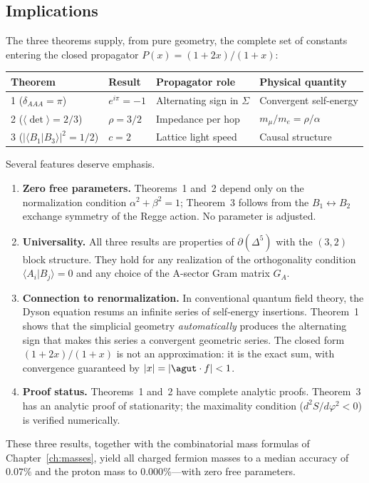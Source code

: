 \subsection{Implications}
\label{sec:variational_implications}

The three theorems supply, from pure geometry, the complete set of
constants entering the closed propagator $P(x) = (1+2x)/(1+x)$:

\begin{center}
\renewcommand{\arraystretch}{1.3}
\begin{tabular}{llll}
\toprule
Theorem & Result & Propagator role & Physical quantity \\
\midrule
1 ($\delta_{AAA} = \pi$) & $e^{i\pi} = -1$ & Alternating sign in $\Sigma$ & Convergent self-energy \\
2 ($\langle\det\rangle = 2/3$) & $\rho = 3/2$ & Impedance per hop & $m_\mu/m_e = \rho/\alpha$ \\
3 ($|\langle B_1|B_3\rangle|^2 = 1/2$) & $c = 2$ & Lattice light speed & Causal structure \\
\bottomrule
\end{tabular}
\end{center}

\noindent
Several features deserve emphasis.

\begin{enumerate}
\item \textbf{Zero free parameters.}
Theorems~1 and~2 depend only on the normalization condition
$\alpha^2 + \beta^2 = 1$; Theorem~3 follows from the $B_1 \leftrightarrow B_2$
exchange symmetry of the Regge action.  No parameter is adjusted.

\item \textbf{Universality.}
All three results are properties of $\partial(\Delta^5)$ with the
$(3,2)$ block structure.  They hold for any realization of the
orthogonality condition $\langle A_i | B_j \rangle = 0$ and any
choice of the A-sector Gram matrix $G_A$.

\item \textbf{Connection to renormalization.}
In conventional quantum field theory, the Dyson equation resums an
infinite series of self-energy insertions.  Theorem~1 shows that the
simplicial geometry \emph{automatically} produces the alternating sign
that makes this series a convergent geometric series.  The closed form
$(1+2x)/(1+x)$ is not an approximation: it is the exact sum, with
convergence guaranteed by $|x| = |\agut \cdot f| < 1$.

\item \textbf{Proof status.}
Theorems~1 and~2 have complete analytic proofs.
Theorem~3 has an analytic proof of stationarity; the maximality
condition ($d^2S/d\varphi^2 < 0$) is verified numerically.
\end{enumerate}

These three results, together with the combinatorial mass formulas of
Chapter~\ref{ch:masses}, yield all charged fermion masses to a median
accuracy of $0.07\%$ and the proton mass to $0.000\%$---with zero
free parameters.
